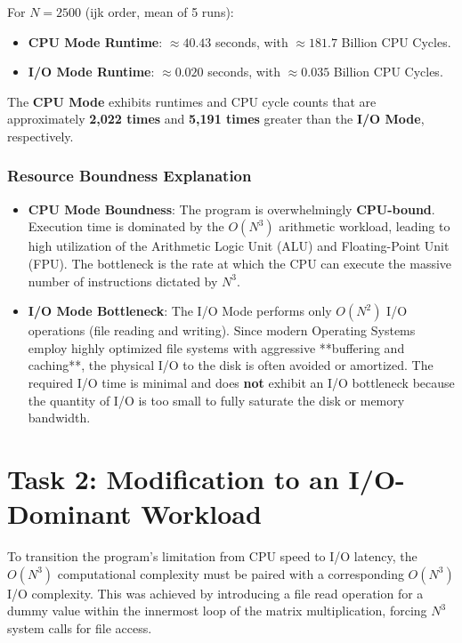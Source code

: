 \documentclass[11pt, a4paper]{article}
\begin{document}
For $N=2500$ (ijk order, mean of 5 runs):
\begin{itemize}
    \item \textbf{CPU Mode Runtime}: $\approx 40.43$ seconds, with $\approx 181.7$ Billion CPU Cycles.
    \item \textbf{I/O Mode Runtime}: $\approx 0.020$ seconds, with $\approx 0.035$ Billion CPU Cycles.
\end{itemize}
The \textbf{CPU Mode} exhibits runtimes and CPU cycle counts that are approximately \textbf{2,022 times} and \textbf{5,191 times} greater than the \textbf{I/O Mode}, respectively.
\subsubsection{Resource Boundness Explanation}
\begin{itemize}
    \item \textbf{CPU Mode Boundness}: The program is overwhelmingly \textbf{CPU-bound}. Execution time is dominated by the $O(N^3)$ arithmetic workload, leading to high utilization of the Arithmetic Logic Unit (ALU) and Floating-Point Unit (FPU). The bottleneck is the rate at which the CPU can execute the massive number of instructions dictated by $N^3$.
    \item \textbf{I/O Mode Bottleneck}: The I/O Mode performs only $O(N^2)$ I/O operations (file reading and writing). Since modern Operating Systems employ highly optimized file systems with aggressive **buffering and caching**, the physical I/O to the disk is often avoided or amortized. The required I/O time is minimal and does \textbf{not} exhibit an I/O bottleneck because the quantity of I/O is too small to fully saturate the disk or memory bandwidth.
\end{itemize}

\section{Task 2: Modification to an I/O-Dominant Workload}

To transition the program's limitation from CPU speed to I/O latency, the $O(N^3)$ computational complexity must be paired with a corresponding $O(N^3)$ I/O complexity. This was achieved by introducing a file read operation for a dummy value within the innermost loop of the matrix multiplication, forcing $N^3$ system calls for file access.
\end{document}
